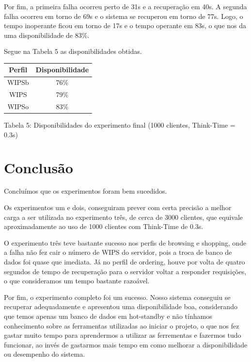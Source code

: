 \documentclass[11pt,twoside]{article}
\begin{document}
Por fim, a primeira falha ocorreu perto de 31s e a recuperação em 40s. A segunda falha ocorreu em torno de 69s e o sistema se recuperou em torno de 77s. Logo, o tempo inoperante ficou em torno de 17s e o tempo operante em 83s, o que nos da uma disponibilidade de 83\%. 

Segue na Tabela 5 as disponibilidades obtidas.

        \begin{center}
        \begin{tabular} { | c | c |}
        \hline
        Perfil  & Disponibilidade \\ \hline
        WIPSb & 76\% \\ \hline
        WIPS & 79\% \\ \hline
        WIPSo & 83\% \\
        \hline
        \end{tabular}

        Tabela 5: Disponibilidades do experimento final (1000 clientes, Think-Time = 0.3s)
    \end{center}

\section{Conclus\~ao}
Concluímos que os experimentos foram bem sucedidos.

Os experimentos um e dois, conseguiram prever com certa precisão a melhor carga a ser utilizada no experimento três, de cerca de 3000 clientes, que equivale aproximadamente ao uso de 1000 clientes com Think-Time de 0.3s.

O experimento três teve bastante sucesso nos perfis de browsing e shopping, onde a falha não fez cair o número de WIPS do servidor, pois a troca de banco de dados foi quase que imediata. Já no perfil de ordering, houve por volta de quatro segundos de tempo de recuperação para o servidor voltar a responder requisições, o que consideramos um tempo bastante razoável.

Por fim, o experimento completo foi um sucesso. Nosso sistema conseguiu se recuperar adequadamente e apresentou uma disponibilidade boa, considerando que temos apenas um banco de dados em hot-standby e não tínhamos conhecimento sobre as ferramentas utilizadas ao iniciar o projeto, o que nos fez gastar muito tempo para aprendermos a utilizar as ferrementas e fazermos tudo funcionar, ao invés de gastarmos mais tempo em como melhorar a disponibilidade ou desempenho do sistema.
\end{document}
